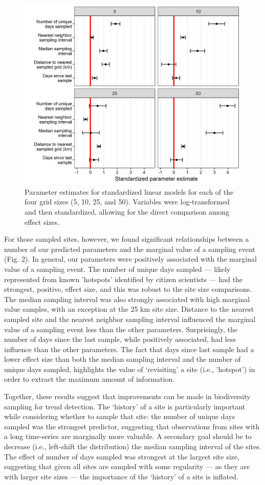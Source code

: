 \documentclass[9pt,twocolumn,twoside,lineno]{pnas-new}
\begin{document}
\begin{figure}[!hb]
\centering
\includegraphics[width=.8\linewidth]{param_estimates.png}
\caption{Parameter estimates for standardized linear models for each of the four grid sizes (5, 10, 25, and 50). Variables were log-transformed and then standardized, allowing for the direct comparison among effect sizes.}
\label{fig2}
\end{figure}

For those sampled sites, however, we found significant relationships between a number of our predicted parameters and the marginal value of a sampling event (Fig. 2). In general, our parameters were positively associated with the marginal value of a sampling event. The number of unique days sampled --- likely represented from known 'hotspots' identified by citizen scientists --- had the strongest, positive, effect size, and this was robust to the site size comparisons. The median sampling interval was also strongly associated with high marginal value samples, with an exception at the 25 km site size. Distance to the nearest sampled site and the nearest neighbor sampling interval influenced the marginal value of a sampling event less than the other parameters. Surprisingly, the number of days since the last sample, while positively associated, had less influence than the other parameters. The fact that days since last sample had a lower effect size than both the median sampling interval and the number of unique days sampled, highlights the value of `revisiting' a site (i.e., 'hotspot') in order to extract the maximum amount of information.

Together, these results suggest that improvements can be made in biodiversity sampling for trend detection. The `history' of a site is particularly important while considering whether to sample that site: the number of unique days sampled was the strongest predictor, suggesting that observations from sites with a long time-series are marginally more valuable. A secondary goal should be to decrease (i.e., left-shift the distribution) the median sampling interval of the sites. The effect of number of days sampled was strongest at the largest site size, suggesting that given all sites are sampled with some regularity --- as they are with larger site sizes --- the importance of the `history' of a site is inflated.
\end{document}
